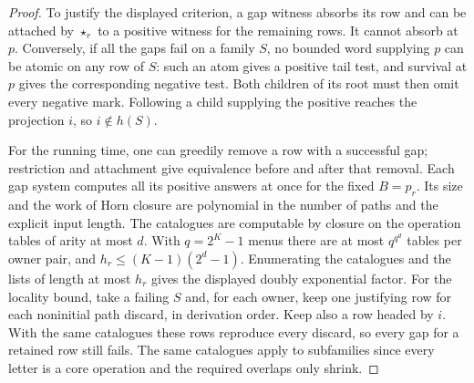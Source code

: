 \begin{proof}
To justify the displayed criterion, a gap witness absorbs its row
and can be attached by $\star_r$ to a positive witness for the
remaining rows. It cannot absorb at $p$. Conversely, if all the gaps
fail on a family $S$, no bounded word supplying $p$ can be atomic on
any row of $S$: such an atom gives a positive tail test, and survival
at $p$ gives the corresponding negative test. Both children of its
root must then omit every negative mark. Following a child supplying
the positive reaches the projection $i$, so $i\notin h(S)$.

For the running time, one can greedily remove a row with a successful
gap; restriction and attachment give equivalence before and after
that removal. Each gap system computes all its positive answers at
once for the fixed $B=p_r$. Its size and the work of Horn closure are
polynomial in the number of paths and the explicit input length.
The catalogues are computable by closure on the operation tables of
arity at most $d$. With $q=2^K-1$ menus there are at most $q^{q^d}$
tables per owner pair, and $h_r\le(K-1)(2^d-1)$. Enumerating the
catalogues and the lists of length at most $h_r$ gives the displayed
doubly exponential factor. For the locality bound,
take a failing $S$ and, for each owner, keep one justifying row for
each noninitial path discard, in derivation order. Keep also a row
headed by $i$. With the same catalogues these rows reproduce every
discard, so every gap for a retained row still fails. The same
catalogues apply to subfamilies since every letter is a core operation
and the required overlaps only shrink.
\end{proof}

